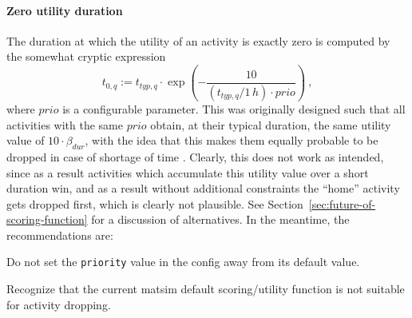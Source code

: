 
\paragraph*{Zero utility duration}

The duration at which the utility of an activity is exactly zero is computed by the somewhat cryptic expression
\[
t_{0,q} := t_{typ,q} \cdot \exp\left( - \frac{10}{(t_{typ,q}/1\,h) \cdot prio} \right) \ ,
\]
where $prio$ is a configurable parameter.  This was originally designed such that all activities with the same $prio$ obtain, at their typical duration, the same utility value of $10 \cdot \beta_{dur}$, with the idea that this makes them equally probable to be dropped in case of shortage of time \cite{CharyparNagel2005ga4acts}.  Clearly, this does not work as intended, since as a result activities which accumulate this utility value over a short duration win, and as a result without additional constraints the ``home'' activity gets dropped first, which is clearly not plausible.  See Section~\ref{sec:future-of-scoring-function} for a discussion of alternatives.  In the meantime, the recommendations are:
\begin{compactitem}
\item Do not set the \lstinline$priority$ value in the config away from its default value.
\item Recognize that the current \acrshort{matsim} default scoring/utility function is not suitable for activity dropping.
\end{compactitem}


